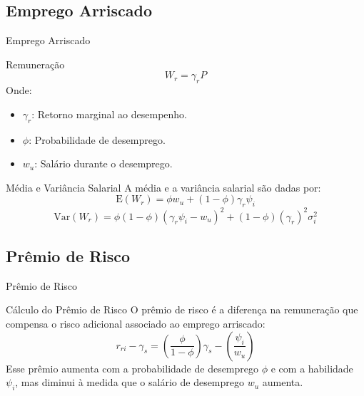 \documentclass[aspectratio=169, xcolor={dvipsnames}, 10pt, brazil]{beamer}
\begin{document}
\subsection{Emprego Arriscado}
\begin{frame}{Emprego Arriscado}

    \begin{block}{Remuneração}
        \[
        W_r = \gamma_r P
        \]
        Onde:
        \begin{itemize}
            \item \( \gamma_r \): Retorno marginal ao desempenho.
            \item \( \phi \): Probabilidade de desemprego.
            \item \( w_u \): Salário durante o desemprego.
        \end{itemize}
    \end{block}

    \begin{block}{Média e Variância Salarial}
        A média e a variância salarial são dadas por:
        \[
        \text{E}(W_r) = \phi w_u + (1 - \phi)\gamma_r \psi_i
        \]
        \[
        \text{Var}(W_r) = \phi(1 - \phi)(\gamma_r \psi_i - w_u)^2 + (1 - \phi)(\gamma_r)^2 \sigma_i^2
        \]
    \end{block}

\end{frame}

\subsection{Prêmio de Risco}
\begin{frame}{Prêmio de Risco}

    \begin{block}{Cálculo do Prêmio de Risco}
        O prêmio de risco é a diferença na remuneração que compensa o risco adicional associado ao emprego arriscado:
        \[
        r_{ri} - \gamma_s = \left(\frac{\phi}{1 - \phi}\right)\gamma_s - \left(\frac{\psi_i}{w_u}\right)
        \]
        Esse prêmio aumenta com a probabilidade de desemprego \( \phi \) e com a habilidade \( \psi_i \), mas diminui à medida que o salário de desemprego \( w_u \) aumenta.
    \end{block}

\end{frame}

\end{document}
